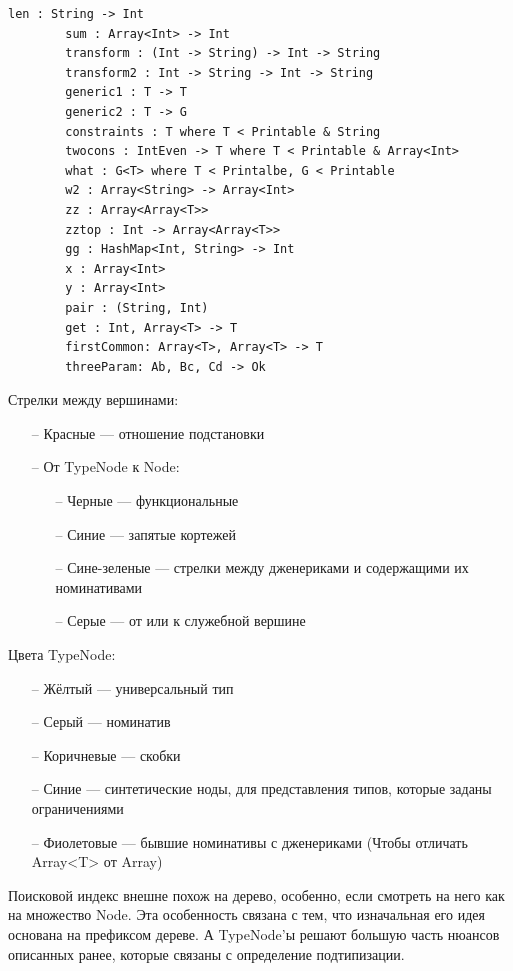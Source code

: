 \documentclass[times]{itmo-student-thesis}
\begin{document}
	
	\begin{lstlisting}[caption={Множество деклараций на основании которых построен поисковый индекс на рисунке ~\ref{fig:1}},label={search_index_declarations}]
		len : String -> Int
		sum : Array<Int> -> Int
		transform : (Int -> String) -> Int -> String
		transform2 : Int -> String -> Int -> String
		generic1 : T -> T
		generic2 : T -> G
		constraints : T where T < Printable & String
		twocons : IntEven -> T where T < Printable & Array<Int>
		what : G<T> where T < Printalbe, G < Printable
		w2 : Array<String> -> Array<Int>
		zz : Array<Array<T>>
		zztop : Int -> Array<Array<T>>
		gg : HashMap<Int, String> -> Int
		x : Array<Int>
		y : Array<Int>
		pair : (String, Int)
		get : Int, Array<T> -> T
		firstCommon: Array<T>, Array<T> -> T
		threeParam: Ab, Bc, Cd -> Ok	
	\end{lstlisting}
	
	\hfill \break
	Стрелки между вершинами:
	\begin{enumerate}
		\item[--] Красные --- отношение подстановки
		\item[--] От TypeNode к Node:
			\begin{enumerate} 
				\item[--] Черные --- функциональные
				\item[--] Синие --- запятые кортежей
				\item[--] Сине-зеленые --- стрелки между дженериками и содержащими их номинативами
				\item[--] Серые --- от или к служебной вершине
			\end{enumerate} 
	\end{enumerate}
	
	\hfill \break
	Цвета TypeNode:
	\begin{enumerate} 
		\item[--] Жёлтый --- универсальный тип
		\item[--] Серый --- номинатив
		\item[--] Коричневые --- скобки
		\item[--] Синие --- синтетические ноды, для представления типов, которые заданы ограничениями
		\item[--] Фиолетовые --- бывшие номинативы с дженериками (Чтобы отличать Array<T> от Array)
	\end{enumerate}
		
	\hfill \break
	Поисковой индекс внешне похож на дерево, особенно, если смотреть на него как на множество Node. Эта особенность связана с тем, что изначальная его идея основана на префиксом дереве. А TypeNode'ы решают большую часть нюансов описанных ранее, которые связаны с определение подтипизации.
	
\end{document}
